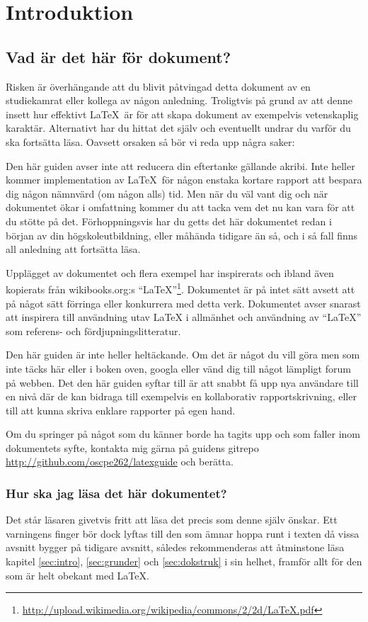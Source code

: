 \section{Introduktion}
\subsection{Vad är det här för dokument?}
Risken är överhängande att du blivit påtvingad detta dokument av en studiekamrat eller kollega av någon anledning. Troligtvis på grund av att denne insett hur effektivt \LaTeX\  är för att skapa dokument av exempelvis vetenskaplig karaktär. Alternativt har du hittat det själv och eventuellt undrar du varför du ska fortsätta läsa. Oavsett orsaken så bör vi reda upp några saker:

Den här guiden avser inte att reducera din eftertanke gällande akribi. Inte heller kommer implementation av \LaTeX\ för någon enstaka kortare rapport att bespara dig någon nämnvärd (om någon alls) tid. Men när du väl vant dig och när dokumentet ökar i omfattning kommer du att tacka vem det nu kan vara för att du stötte på det. Förhoppningsvis har du getts det här dokumentet redan i början av din högskoleutbildning, eller måhända tidigare än så, och i så fall finns all anledning att fortsätta läsa.

Upplägget av dokumentet och flera exempel har inspirerats och ibland även kopierats från wikibooks.org:s ``LaTeX''\footnote{\url{http://upload.wikimedia.org/wikipedia/commons/2/2d/LaTeX.pdf}}. Dokumentet är på intet sätt avsett att på något sätt förringa eller konkurrera med detta verk. Dokumentet avser snarast att inspirera till användning utav \LaTeX{} i allmänhet och användning av ``LaTeX'' som referens- och fördjupningslitteratur.

Den här guiden är inte heller heltäckande. Om det är något du vill göra men som inte täcks här eller i boken oven, googla eller vänd dig till något lämpligt forum på webben. Det den här guiden syftar till är att snabbt få upp nya användare till en nivå där de kan bidraga till exempelvis en kollaborativ rapportskrivning, eller till att kunna skriva enklare rapporter på egen hand.

Om du springer på något som du känner borde ha tagits upp och som faller inom dokumentets syfte, kontakta mig gärna på guidens gitrepo \href{http://github.com/oscpe262/latexguide}{\url{http://github.com/oscpe262/latexguide}} och berätta.

\subsubsection{Hur ska jag läsa det här dokumentet?}
Det står läsaren givetvis fritt att läsa det precis som denne själv önskar. Ett varningens finger bör dock lyftas till den som ämnar hoppa runt i texten då vissa avsnitt bygger på tidigare avsnitt, således rekommenderas att åtminstone läsa kapitel \ref{sec:intro}, \ref{sec:grunder} och \ref{sec:dokstruk} i sin helhet, framför allt för den som är helt obekant med \LaTeX.

